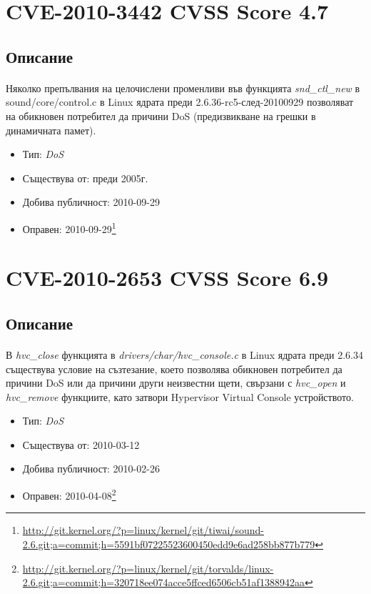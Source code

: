 \documentclass[a4paper,12pt,leqno]{article}
\begin{document}
\section{CVE-2010-3442 CVSS Score 4.7}
\subsection{Описание}
\paragraph{}
Няколко препълвания на целочислени променливи във функцията \textit{snd\_ctl\_new} в sound/core/control.c в Linux ядрата преди 2.6.36-rc5-след-20100929 позволяват на обикновен потребител да причини DoS (предизвикване на грешки в динамичната памет).

\begin{itemize}
    \item Тип: \textit{DoS}
    \item Съществува от: преди 2005г.
  	\item Добива публичност: 2010-09-29
    \item Оправен: 2010-09-29\footnote{\url{http://git.kernel.org/?p=linux/kernel/git/tiwai/sound-2.6.git;a=commit;h=5591bf07225523600450edd9e6ad258bb877b779}}
\end{itemize}

\section{CVE-2010-2653 CVSS Score 6.9}
\subsection{Описание}
\paragraph{}
В \textit{hvc\_close} функцията в \textit{drivers/char/hvc\_console.c} в Linux ядрата преди 2.6.34 съществува условие на съзтезание, което позволява обикновен потребител да причини DoS или да причини други неизвестни щети, свързани с \textit{hvc\_open} и \textit{hvc\_remove} функциите, като затвори Hypervisor Virtual Console устройството.

\begin{itemize}
    \item Тип: \textit{DoS}
    \item Съществува от: 2010-03-12
  	\item Добива публичност: 2010-02-26
    \item Оправен: 2010-04-08\footnote{\url{http://git.kernel.org/?p=linux/kernel/git/torvalds/linux-2.6.git;a=commit;h=320718ee074acce5ffced6506cb51af1388942aa}}
\end{itemize}
\end{document}
